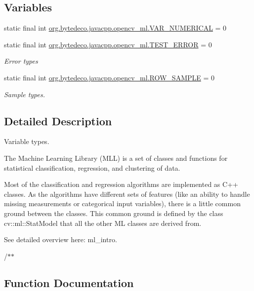 \subsection*{Variables}
\begin{DoxyCompactItemize}
\item 
static final int \hyperlink{group__ml_ga4e7d272fa71d294a93e6a89edeacdec8}{org.\+bytedeco.\+javacpp.\+opencv\+\_\+ml.\+V\+A\+R\+\_\+\+N\+U\+M\+E\+R\+I\+C\+AL} = 0
\item 
static final int \hyperlink{group__ml_gab8408e7a56e10d19a84684bb008d0e9f}{org.\+bytedeco.\+javacpp.\+opencv\+\_\+ml.\+T\+E\+S\+T\+\_\+\+E\+R\+R\+OR} = 0
\begin{DoxyCompactList}\small\item\em Error types \end{DoxyCompactList}\item 
static final int \hyperlink{group__ml_gaa71abe7b3688e0e9b0b79af6e224286e}{org.\+bytedeco.\+javacpp.\+opencv\+\_\+ml.\+R\+O\+W\+\_\+\+S\+A\+M\+P\+LE} = 0
\begin{DoxyCompactList}\small\item\em Sample types. \end{DoxyCompactList}\end{DoxyCompactItemize}


\subsection{Detailed Description}
Variable types. 

The Machine Learning Library (M\+LL) is a set of classes and functions for statistical classification, regression, and clustering of data. 

Most of the classification and regression algorithms are implemented as C++ classes. As the algorithms have different sets of features (like an ability to handle missing measurements or categorical input variables), there is a little common ground between the classes. This common ground is defined by the class cv\+::ml\+::\+Stat\+Model that all the other ML classes are derived from. 

See detailed overview here\+: ml\+\_\+intro.

/$\ast$$\ast$ 

\subsection{Function Documentation}
\mbox{\label{group__ml_gaeb2cdd5950f92be2f699b6ad5cf4a9ba}} 
